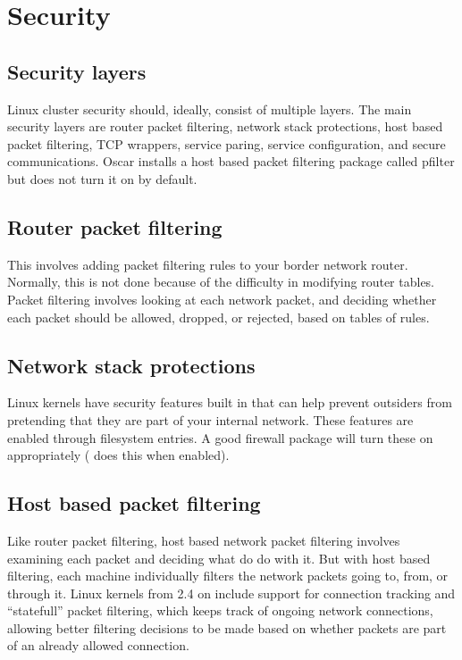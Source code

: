 %
%
%

\section{Security}
\label{app:security}

\subsection{Security layers}
Linux cluster security should, ideally, consist of multiple layers.
The main security layers are router packet filtering, 
network stack protections, host based packet filtering, TCP wrappers,
service paring, service configuration, and secure communications.
Oscar installs a host based packet filtering package called pfilter
but does not turn it on by default.

\subsection{Router packet filtering}

This involves adding packet filtering rules to your border network router.
Normally, this is not done because of the difficulty in modifying router
tables. Packet filtering involves looking at each network packet,
and deciding whether each packet should be allowed, dropped, or rejected,
based on tables of rules.

\subsection{Network stack protections}

Linux kernels have security features built in that can help prevent
outsiders from pretending that they are part of your internal network.
These features are enabled through  filesystem entries.  A
good firewall package will turn these on appropriately
( does this when enabled).

\subsection{Host based packet filtering}

Like router packet filtering, host based network packet filtering
involves examining each packet and deciding what do do with it.  But
with host based filtering, each machine individually filters the
network packets going to, from, or through it.  Linux kernels from 2.4
on include support for connection tracking and ``statefull'' packet 
filtering, which keeps track of ongoing network connections, allowing better
filtering decisions to be made based on whether packets are part of an
already allowed connection. 

